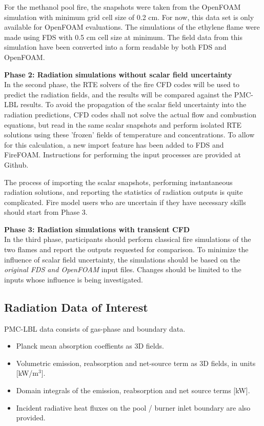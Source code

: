 \documentclass[12pt]{article}
\begin{document}
For the methanol pool fire, the snapshots were taken from the OpenFOAM simulation with minimum grid cell size of 0.2 cm. For now, this data set is only available for OpenFOAM evaluations. The simulations of the ethylene flame were made using FDS with 0.5 cm cell size at minimum. The field data from this simulation have been converted into a form readable by both FDS and OpenFOAM.

\noindent \textbf{Phase 2: Radiation simulations without scalar field uncertainty}\\
In the second phase, the RTE solvers of the fire CFD codes will be used to predict the radiation fields, and the results will be compared against the PMC-LBL results. To avoid the propagation of the scalar field uncertainty into the radiation predictions, CFD codes shall not solve the actual flow and combustion equations, but read in the same scalar snapshots and perform isolated RTE solutions using these 'frozen' fields of temperature and concentrations. To allow for this calculation, a new import feature has been added to FDS and FireFOAM. Instructions for performing the input processes are provided at Github. 

The process of importing the scalar snapshots, performing instantaneous radiation solutions, and reporting the statistics of radiation outputs is quite complicated. Fire model users who are uncertain if they have necessary skills should start from Phase 3.

\noindent \textbf{Phase 3: Radiation simulations with transient CFD}\\
In the third phase, participants should perform classical fire simulations of the two flames and report the outputs requested for comparison. To minimize the influence of scalar field uncertainty, the simulations should be based on the \textit{original FDS and OpenFOAM} input files. Changes should be limited to the inputs whose influence is being investigated.

\subsection{Radiation Data of Interest}

PMC-LBL data consists of gas-phase and boundary data. 
\begin{itemize}[noitemsep]
    \item Planck mean absorption coeffients as 3D fields.
    \item Volumetric emission, reabsorption and net-source term as 3D fields, in units [kW/m$^3$]. \item Domain integrals of the emission, reabsorption and net source terms [kW].
    \item Incident radiative heat fluxes on the pool / burner inlet boundary are also provided.
\end{itemize}
\end{document}
